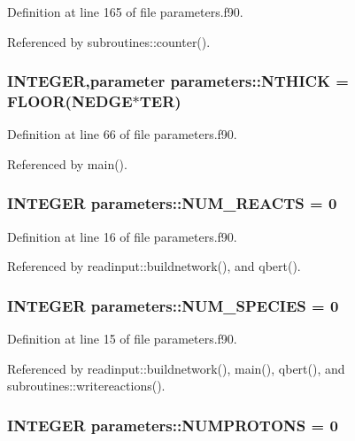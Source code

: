 Definition at line 165 of file parameters.f90.

Referenced by subroutines::counter().\hypertarget{namespaceparameters_adf37b75c4792b28d45484737d230ead3}{
\subsubsection[{NTHICK}]{\setlength{\rightskip}{0pt plus 5cm}INTEGER,parameter {\bf parameters::NTHICK} = FLOOR({\bf NEDGE}$\ast${\bf TER})}}
\label{namespaceparameters_adf37b75c4792b28d45484737d230ead3}


Definition at line 66 of file parameters.f90.

Referenced by main().\hypertarget{namespaceparameters_a1462d3a8d5ef4ee00ffc9c0beac695b2}{
\subsubsection[{NUM\_\-REACTS}]{\setlength{\rightskip}{0pt plus 5cm}INTEGER {\bf parameters::NUM\_\-REACTS} = 0}}
\label{namespaceparameters_a1462d3a8d5ef4ee00ffc9c0beac695b2}


Definition at line 16 of file parameters.f90.

Referenced by readinput::buildnetwork(), and qbert().\hypertarget{namespaceparameters_aed3ebeff9daeb47edfa593ae2b72d4db}{
\subsubsection[{NUM\_\-SPECIES}]{\setlength{\rightskip}{0pt plus 5cm}INTEGER {\bf parameters::NUM\_\-SPECIES} = 0}}
\label{namespaceparameters_aed3ebeff9daeb47edfa593ae2b72d4db}


Definition at line 15 of file parameters.f90.

Referenced by readinput::buildnetwork(), main(), qbert(), and subroutines::writereactions().\hypertarget{namespaceparameters_abf21c9c60fbc062ca9e84d2746c7388a}{
\subsubsection[{NUMPROTONS}]{\setlength{\rightskip}{0pt plus 5cm}INTEGER {\bf parameters::NUMPROTONS} = 0}}
\label{namespaceparameters_abf21c9c60fbc062ca9e84d2746c7388a}



